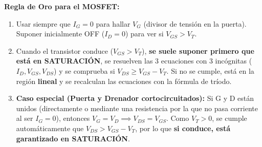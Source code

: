 \begin{aviso}
\renewcommand{\arraystretch}{1.3}
\begin{center}
\end{center}
\textbf{Regla de Oro para el MOSFET:}
\begin{enumerate}[leftmargin=*]
    \item Usar siempre que $I_G = 0$ para hallar $V_G$ (divisor de tensión en la puerta). Suponer inicialmente OFF ($I_D = 0$) para ver si $V_{GS} > V_T$.
    \item Cuando el transistor conduce ($V_{GS} > V_T$), \textbf{se suele suponer primero que está en SATURACIÓN}, se resuelven las 3 ecuaciones con 3 incógnitas ($I_D, V_{GS}, V_{DS}$) y se comprueba si $V_{DS} \ge V_{GS} - V_T$. Si no se cumple, está en la región \textbf{lineal} y se recalculan las ecuaciones con la fórmula de tríodo.
    \item \textbf{Caso especial (Puerta y Drenador cortocircuitados):} Si G y D están unidos (directamente o mediante una resistencia por la que no pasa corriente al ser $I_G = 0$), entonces $V_G = V_D \implies V_{DS} = V_{GS}$. Como $V_T > 0$, se cumple automáticamente que $V_{DS} > V_{GS} - V_T$, por lo que \textbf{si conduce, está garantizado en SATURACIÓN}.
\end{enumerate}
\end{aviso}

